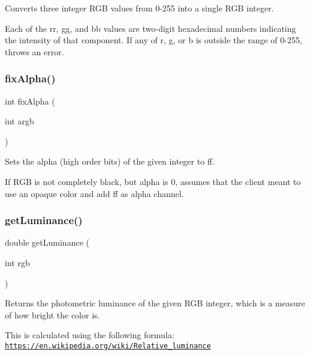 Converts three integer R\+GB values from 0-\/255 into a single R\+GB integer. 

Each of the {\ttfamily rr}, {\ttfamily gg}, and {\ttfamily bb} values are two-\/digit hexadecimal numbers indicating the intensity of that component. If any of r, g, or b is outside the range of 0-\/255, throws an error. \mbox{\label{classGColor_a0dd42e0c5898738e5edb542e06b7496c}} 
\subsubsection{\texorpdfstring{fix\+Alpha()}{fixAlpha()}}
{\footnotesize\ttfamily int fix\+Alpha (\begin{DoxyParamCaption}\item[{int}]{argb }\end{DoxyParamCaption})\hspace{0.3cm}{\ttfamily [static]}}



Sets the \textquotesingle{}alpha\textquotesingle{} (high order bits) of the given integer to ff. 

If R\+GB is not completely black, but alpha is 0, assumes that the client meant to use an opaque color and add ff as alpha channel. \mbox{\label{classGColor_abf11afacb5154dec7b8c4ba82ae4cb05}} 
\subsubsection{\texorpdfstring{get\+Luminance()}{getLuminance()}\hspace{0.1cm}{\footnotesize\ttfamily [1/2]}}
{\footnotesize\ttfamily double get\+Luminance (\begin{DoxyParamCaption}\item[{int}]{rgb }\end{DoxyParamCaption})\hspace{0.3cm}{\ttfamily [static]}}



Returns the photometric luminance of the given R\+GB integer, which is a measure of how bright the color is. 

This is calculated using the following formula\+: \href{https://en.wikipedia.org/wiki/Relative_luminance}{\tt https\+://en.\+wikipedia.\+org/wiki/\+Relative\+\_\+luminance} \mbox{\label{classGColor_a677f43c53c7f2f5c5294cc23241cc9a7}} 
